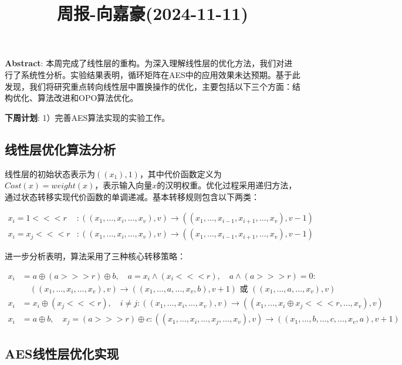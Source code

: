 \documentclass[11pt,a4paper]{article}
\title{周报-向嘉豪(2024-11-11)}
\newcommand{\lll}{\mathrel{<\!\!<\!\!<}}
\newcommand{\ggg}{\mathrel{>\!\!>\!\!>}}
\renewcommand{\maketitle}{
  \begin{center}
    \LARGE\bfseries\thetitle
  \end{center}
}
\begin{document}
\maketitle


\noindent \textbf{Abstract}: 本周完成了线性层的重构。为深入理解线性层的优化方法，我们对\cite{Leurent2024}进行了系统性分析。实验结果表明，循环矩阵在AES中的应用效果未达预期。基于此发现，我们将研究重点转向线性层中置换操作的优化，主要包括以下三个方面：结构优化、算法改进和OPO算法优化。

\noindent \textbf{下周计划}: 1）完善AES算法实现的实验工作。

\subsection{线性层优化算法分析}

线性层的初始状态表示为$((x_1), 1)$，其中代价函数定义为$Cost(x) = weight(x)$，表示输入向量$x$的汉明权重。优化过程采用递归方法，通过状态转移实现代价函数的单调递减。基本转移规则包含以下两类：

\begin{align}
x_{i} = 1 \lll r & : ((x_1, \dots, x_{i}, \dots, x_v), v) \rightarrow ((x_1, \dots, x_{i-1}, x_{i+1}, \dots, x_v), v-1) \\
x_{i} = x_{j} \lll r & : ((x_1, \dots, x_{i}, \dots, x_v), v) \rightarrow ((x_1, \dots, x_{i-1}, x_{i+1}, \dots, x_v), v-1)
\end{align}

进一步分析表明，算法采用了三种核心转移策略：

\begin{align}
x_i &= a \oplus (a \ggg r) \oplus b, \quad a = x_i \land (x_i \lll r), \quad a \land (a \ggg r) = 0 : \nonumber \\
&\quad ((x_1, \dots, x_{i}, \dots, x_v), v) \rightarrow ((x_1, \dots, a, \dots, x_v, b), v+1) \text{ 或 } ((x_1, \dots, a, \dots, x_v), v) \\
x_{i} &= x_{i} \oplus (x_{j} \lll r), \quad i \neq j : ((x_1, \dots, x_{i}, \dots, x_v), v) \rightarrow ((x_1, \dots, x_{i} \oplus x_{j} \lll r, \dots, x_v), v) \\
x_i &= a \oplus b, \quad x_j = (a \ggg r) \oplus c : ((x_1, \dots, x_{i}, \dots, x_{j}, \dots, x_v), v) \rightarrow ((x_1, \dots, b, \dots, c, \dots, x_v, a), v+1)
\end{align}

\subsection{AES线性层优化实现}
\end{document}
